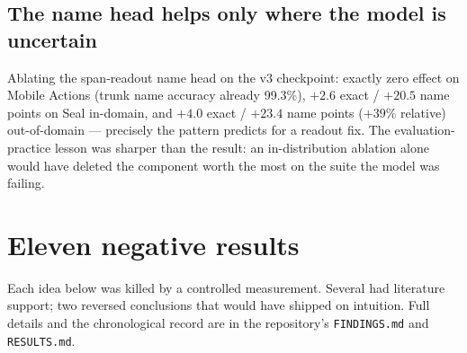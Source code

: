 \documentclass[10pt]{article}
\begin{document}
\subsection{The name head helps only where the model is uncertain}

Ablating the span-readout name head on the v3 checkpoint: exactly zero effect
on Mobile Actions (trunk name accuracy already 99.3\%), $+2.6$ exact /
$+20.5$ name points on Seal in-domain, and $+4.0$ exact / $+23.4$ name points
($+39\%$ relative) out-of-domain --- precisely the pattern \citet{lnp}
predicts for a readout fix. The evaluation-practice lesson was sharper than
the result: an in-distribution ablation alone would have deleted the
component worth the most on the suite the model was failing.

\section{Eleven negative results}
\label{sec:negative}

Each idea below was killed by a controlled measurement. Several had
literature support; two reversed conclusions that would have shipped on
intuition. Full details and the chronological record are in the repository's
\texttt{FINDINGS.md} and \texttt{RESULTS.md}.
\end{document}
